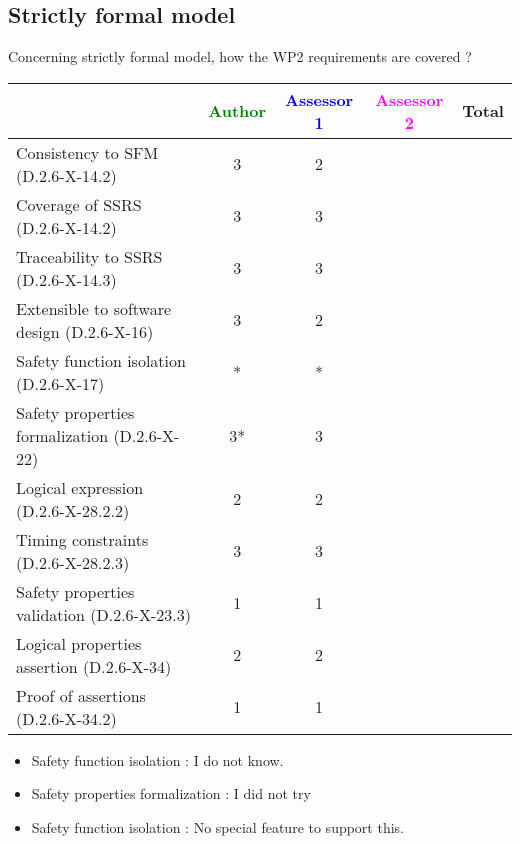 \subsection{Strictly formal model}

Concerning strictly formal model, how the WP2 requirements are covered ?

\begin{tabular}{|l | c | c | c | c|}
\hline
& \textcolor{green}{Author} & \textcolor{blue}{Assessor 1} & \textcolor{magenta}{Assessor 2} & Total \\
\hline 
Consistency to SFM (D.2.6-X-14.2) &3 & 2& &  \\
\hline
Coverage of SSRS (D.2.6-X-14.2)  & 3& 3& &  \\
\hline
Traceability to  SSRS (D.2.6-X-14.3)  & 3& 3& &  \\
\hline
Extensible to software design (D.2.6-X-16)  &3 & 2& &  \\
\hline
Safety function isolation (D.2.6-X-17)  &*  & * & &  \\
\hline 
Safety properties formalization (D.2.6-X-22)  &3* & 3 & &  \\
\hline
Logical expression (D.2.6-X-28.2.2)  &2 & 2& &  \\
\hline
Timing constraints (D.2.6-X-28.2.3)  &3 & 3& &  \\
\hline
Safety properties validation (D.2.6-X-23.3)  &1 & 1& &  \\
\hline
Logical properties assertion (D.2.6-X-34)  &2 & 2& &  \\
\hline
Proof of assertions (D.2.6-X-34.2)  &1 & 1& &  \\
\hline
\end{tabular}

\begin{author_comment}
\begin{itemize}
\item Safety function isolation :  I do not know.
\item Safety properties formalization : I did not try
\end{itemize}

\end{author_comment}

\begin{assessor1}
\begin{itemize}
\item Safety function isolation :  No special feature to support this.
\end{itemize}

\end{assessor1}

